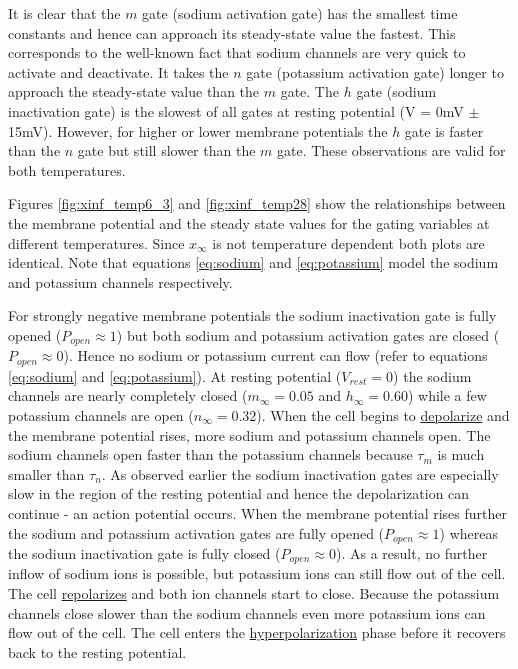 \documentclass{scrartcl}
\begin{document}
It is clear that the $m$ gate (sodium activation gate) has the smallest time constants and hence can approach its steady-state value the fastest. This corresponds to the well-known fact that sodium channels are very quick to activate and deactivate. It takes the $n$ gate (potassium activation gate) longer to approach the steady-state value than the $m$ gate. The $h$ gate (sodium inactivation gate) is the slowest of all gates at resting potential (V = 0mV $\pm$ 15mV). However, for higher or lower membrane potentials the $h$ gate is faster than the $n$ gate but still slower than the $m$ gate. These observations are valid for both temperatures. 

Figures \ref{fig:xinf_temp6_3} and \ref{fig:xinf_temp28} show the relationships between the membrane potential and the steady state values for the gating variables at different temperatures. Since $x_\infty$ is not temperature dependent both plots are identical. Note that equations \ref{eq:sodium} and \ref{eq:potassium} model the sodium and potassium channels respectively. 

For strongly negative membrane potentials the sodium inactivation gate is fully opened ($P_{open} \approx 1$) but both sodium and potassium activation gates are closed ($P_{open} \approx 0$). Hence no sodium or potassium current can flow (refer to equations \ref{eq:sodium} and \ref{eq:potassium}). At resting potential ($V_{rest} = 0$) the sodium channels are nearly completely closed ($m_\infty=0.05$ and $h_\infty=0.60$) while a few potassium channels are open ($n_\infty=0.32$). When the cell begins to \underline{depolarize} and the membrane potential rises, more sodium and potassium channels open. The sodium channels open faster than the potassium channels because $\tau_m$ is much smaller than $\tau_n$. As observed earlier the sodium inactivation gates are especially slow in the region of the resting potential and hence the depolarization can continue - an action potential occurs. When the membrane potential rises further the sodium and potassium activation gates are fully opened ($P_{open} \approx 1$) whereas the sodium inactivation gate is fully closed ($P_{open} \approx 0$). As a result, no further inflow of sodium ions is possible, but potassium ions can still flow out of the cell. The cell \underline{repolarizes} and both ion channels start to close. Because the potassium channels close slower than the sodium channels even more potassium ions can flow out of the cell. The cell enters the \underline{hyperpolarization} phase before it recovers back to the resting potential.
\end{document}
